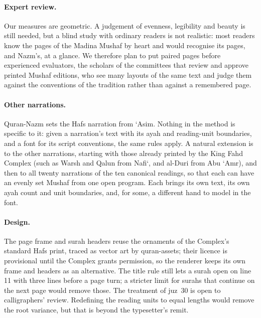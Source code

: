 \documentclass[sigconf,nonacm]{acmart}
\begin{document}
\paragraph{Expert review.} Our measures are geometric. A judgement of evenness, legibility and beauty is still needed, but a blind study with ordinary readers is not realistic: most readers know the pages of the Madina Mushaf by heart and would recognise its pages, and Nazm's, at a glance. We therefore plan to put paired pages before experienced evaluators, the scholars of the committees that review and approve printed Mushaf editions, who see many layouts of the same text and judge them against the conventions of the tradition rather than against a remembered page.

\paragraph{Other narrations.} Quran-Nazm sets the Hafs narration from `Asim. Nothing in the method is specific to it: given a narration's text with its ayah and reading-unit boundaries, and a font for its script conventions, the same rules apply. A natural extension is to the other narrations, starting with those already printed by the King Fahd Complex (such as Warsh and Qalun from Nafi`, and al-Duri from Abu `Amr), and then to all twenty narrations of the ten canonical readings, so that each can have an evenly set Mushaf from one open program. Each brings its own text, its own ayah count and unit boundaries, and, for some, a different hand to model in the font.

\paragraph{Design.} The page frame and surah headers reuse the ornaments of the Complex's standard Hafs print, traced as vector art by quran-assets; their licence is provisional until the Complex grants permission, so the renderer keeps its own frame and headers as an alternative. The title rule still lets a surah open on line 11 with three lines before a page turn; a stricter limit for surahs that continue on the next page would remove those. The treatment of juz~30 is open to calligraphers' review. Redefining the reading units to equal lengths would remove the root variance, but that is beyond the typesetter's remit.
\end{document}
